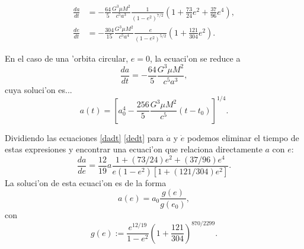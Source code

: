 \begin{align}
\frac{da}{dt} &= -\frac{64}{5}\frac{G^3\mu M^2}{c^5a^3}\frac{1}{\left(1-e^2\right)^{7/2}}\left(1+\frac{73}{24}e^2+\frac{37}{96}e^4\right) \label{dadt},\\
\frac{de}{dt} &= -\frac{304}{15}\frac{G^3\mu M^2}{c^5a^4}\frac{e}{\left(1-e^2\right)^{5/2}}\left(1+\frac{121}{304}e^2\right). \label{dedt}
\end{align}

En el caso de una 'orbita circular, $e=0$, la ecuaci'on se reduce a
\begin{equation}
\frac{da}{dt} = -\frac{64}{5}\frac{G^3\mu M^2}{c^5a^3},
\end{equation}
cuya soluci'on es...
\begin{equation}
a(t) = \left[a_0^4-\frac{256}{5}\frac{G^3\mu M^2}{c^5}(t-t_0)\right]^{1/4}.
\end{equation}

Dividiendo las ecuaciones \eqref{dadt} \eqref{dedt} para $\dot{a}$ y $\dot{e}$ podemos eliminar el tiempo de estas expresiones y encontrar una ecuaci'on que relaciona directamente $a$ con $e$:
\begin{equation}
\frac{da}{de}=\frac{12}{19}a\frac{1+(73/24)e^2+(37/96)e^4}{e(1-e^2)[1+(121/304)e^2]}.
\end{equation}
La soluci'on de esta ecuaci'on es de la forma
\begin{equation}
a(e)=a_{0}\frac{g(e)}{g(e_{0})},
\end{equation}
con 
\begin{equation}
g(e):= \frac{e^{12/19}}{1-e^2}\left(1+\frac{121}{304} \right)^{870/2299}.
\end{equation}

